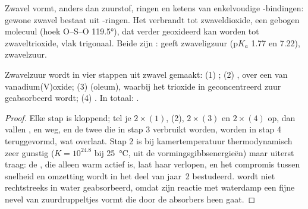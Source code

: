 Zwavel vormt, anders dan zuurstof, ringen en ketens van enkelvoudige
-bindingen: gewone zwavel bestaat uit -ringen. Het
verbrandt tot zwaveldioxide, een gebogen molecuul (hoek O--S--O
\ang{119.5}), dat verder geoxideerd kan worden tot zwaveltrioxide, vlak
trigonaal. Beide zijn :  geeft zwaveligzuur
($\mathrm{p}K_a$ 1.77 en 7.22),  zwavelzuur.

\begin{proposition}\label{prop:b1:p-block-16-18:contact-steps}
Zwavelzuur wordt in vier stappen uit zwavel gemaakt:
(1) ; (2) , over een 
van vanadium(V)oxide; (3)  (oleum), waarbij het
trioxide in geconcentreerd zuur geabsorbeerd wordt; (4) .
In totaal: .
\end{proposition}

\begin{proof}
Elke stap is kloppend; tel je $2\times(1)$, (2), $2\times(3)$ en
$2\times(4)$ op, dan vallen ,  en  weg, en de
twee  die in stap 3 verbruikt worden, worden in stap 4
teruggevormd, wat  overlaat. Stap 2 is bij
kamertemperatuur thermodynamisch zeer gunstig ($K = 10^{24.8}$ bij
\qty{25}{\celsius}, uit de vormingsgibbsenergieën) maar uiterst traag: de
, die alleen warm actief is, laat haar verlopen, en het
compromis tussen snelheid en omzetting wordt in het deel van jaar~2
bestudeerd.  wordt niet rechtstreeks in water geabsorbeerd, omdat
zijn reactie met waterdamp een fijne nevel van zuurdruppeltjes vormt die
door de absorbers heen gaat.
\end{proof}

